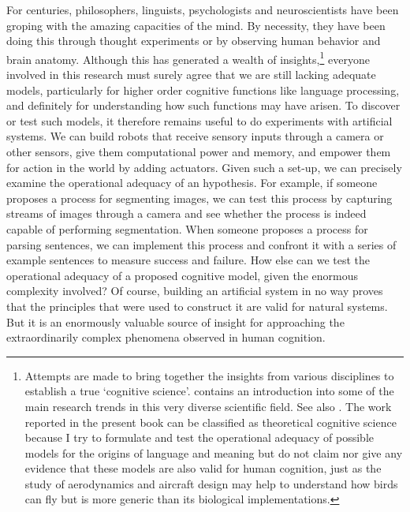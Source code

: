 For centuries, philosophers, linguists, psychologists and 
neuroscientists have been groping with the amazing capacities
of the mind. By necessity, they have been doing this through
thought experiments or by observing human behavior and
brain anatomy. Although this has generated a wealth
of insights,\footnote{Attempts are made to bring together the insights from various
disciplines to establish a true `cognitive science'. 
\cite{Osherton:1995} contains an introduction into some of the main 
research trends in this very diverse scientific field. 
See also \cite{Luger:1994}. The work reported in the present book can be 
classified as theoretical
cognitive science because I try to formulate and test
the operational adequacy of possible models for the 
origins of language and meaning but do not claim nor
give any evidence that these models are also valid for
human cognition, just as the study of aerodynamics and 
aircraft design may help to understand how birds can 
fly but is more generic than its biological 
implementations.}
everyone involved in this research must surely 
agree that we are still lacking adequate models, 
particularly for higher order cognitive functions like language
processing, and definitely for understanding how such 
functions may have arisen. 
To discover or test such models, it therefore
remains useful to do experiments with artificial systems.
We can build robots that receive sensory inputs
through a camera or other sensors, give them computational 
power and memory, and empower them 
for action in the world by adding actuators. Given such a 
set-up, we can precisely examine the operational adequacy 
of an hypothesis. For example, if someone proposes
a process for segmenting images, we can test this process 
by capturing streams of images through a camera and 
see whether the process is indeed capable of performing 
segmentation. When someone proposes a process 
for parsing sentences, we 
can implement this process and confront it with a series of 
example sentences to measure success and failure. 
How else can we test the operational adequacy of a proposed
cognitive model, given the enormous complexity involved? 
Of course, building an artificial system in no way proves
that the principles that were used to construct it are valid
for natural systems. But it is an enormously valuable 
source of insight for approaching the extraordinarily 
complex phenomena observed in human cognition. 


